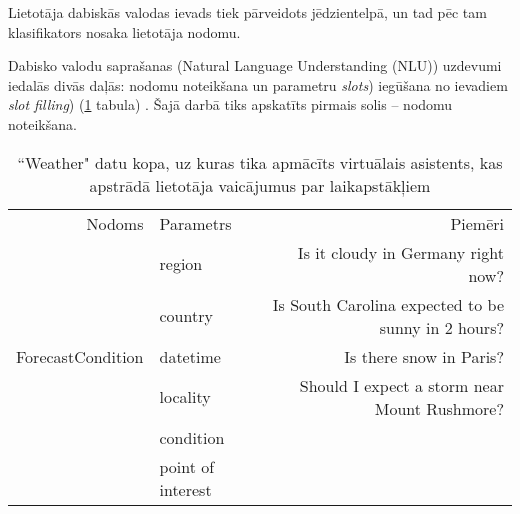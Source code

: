 Lietotāja dabiskās valodas ievads tiek pārveidots jēdzientelpā, un tad pēc tam klasifikators nosaka lietotāja nodomu.

Dabisko valodu saprašanas (Natural Language Understanding (NLU)) uzdevumi iedalās divās daļās: nodomu noteikšana un parametru \textit{slots}) iegūšana no ievadiem \textit{slot filling}) (\ref{tab:slots} tabula) \cite{snips-2018}. Šajā darbā tiks apskatīts pirmais solis -- nodomu noteikšana.


\begin{table}[htbp]
    \centering
    \caption{``Weather" datu kopa, uz kuras tika apmācīts virtuālais asistents, kas apstrādā lietotāja vaicājumus par laikapstākļiem  \cite{snips-2018}}
    \begin{tabular}{rlr}
        Nodoms            & Parametrs                                           & Piemēri                                                                                                                                            \\
        & \textcolor[rgb]{ .439,  .188,  .627}{ region}           & Is it \textcolor[rgb]{ 1,  .753,  0}{cloudy} in \textcolor[rgb]{ 1,  0,  0}{Germany} \textcolor[rgb]{ .573,  .816,  .314}{ right now}?                         \\
        & \textcolor[rgb]{ 1,  0,  0}{ country}                   & Is \textcolor[rgb]{ .439,  .188,  .627}{South Carolina} expected to be \textcolor[rgb]{ 1,  .753,  0}{sunny} \textcolor[rgb]{ .573,  .816,  .314}{in 2 hours}? \\
        ForecastCondition & \textcolor[rgb]{ .573,  .816,  .314}{ datetime}         & Is there \textcolor[rgb]{ 1,  .753,  0}{snow} in \textcolor[rgb]{ 0,  .69,  .941}{Paris}?                                                                  \\
        & \textcolor[rgb]{ 0,  .69,  .941}{ locality}             & Should I expect a \textcolor[rgb]{ 1,  .753,  0}{storm} near \textcolor[rgb]{ .929,  .49,  .192}{Mount Rushmore}?                                          \\
        & \textcolor[rgb]{ 1,  .753,  0}{ condition}              &                                                                                                                                                    \\
        & \textcolor[rgb]{ .929,  .49,  .192}{ point of interest} &                                                                                                                                                    \\
    \end{tabular}%
    \label{tab:slots}%
\end{table}%


